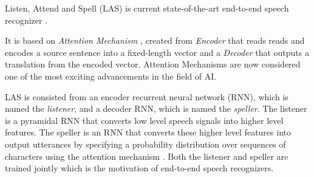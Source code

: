 Listen, Attend and Spell (LAS) is current state-of-the-art end-to-end speech recognizer \cite{las}.

It is based on \textit{Attention Mechanism} \cite{attetion_mech}, created from \textit{Encoder} that reads reads and encodes a source sentence into a fixed-length vector and a \textit{Decoder} that outputs a translation from the encoded vector.
Attention Mechanisms are now considered one of the most exciting advancements in the field of AI.

LAS is consisted from an encoder recurrent neural network (RNN), which is named the \textit{listener}, and a decoder RNN, which is named the \textit{speller}.
The listener is a pyramidal RNN that converts low level speech signals into higher level features.
The speller is an RNN that converts these higher level features into output utterances by specifying a probability distribution over sequences of characters using the attention mechanism \cite{las_info}.
Both the listener and speller are trained jointly which is the motivation of end-to-end speech recognizers.
